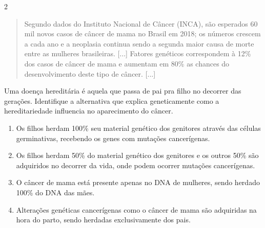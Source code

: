 \num{2}
\begin{quote}
Segundo dados do Instituto Nacional de Câncer (INCA), são esperados
60 mil novos casos de câncer de mama no Brasil em 2018; os números
crescem a cada ano e a neoplasia continua sendo a segunda maior causa
de morte entre as mulheres brasileiras. [...]
Fatores genéticos correspondem
à 12\% dos casos de câncer de mama e aumentam em 80\% as chances do
desenvolvimento deste tipo de câncer. [...]

\end{quote}

Uma doença hereditária é aquela que passa de pai pra filho no decorrer
das gerações. Identifique a alternativa que explica geneticamente como a
hereditariedade influencia no aparecimento do câncer.

\begin{enumerate}
\item
  Os filhos herdam 100\% seu material genético dos genitores através das
  células germinativas, recebendo os genes com mutações cancerígenas.
\item
  Os filhos herdam 50\% do material genético dos genitores e os outros
  50\% são adquiridos no decorrer da vida, onde podem ocorrer mutações
  cancerígenas.
\item
  O câncer de mama está presente apenas no DNA de mulheres, sendo herdado
  100\% do DNA das mães.
\item
  Alterações genéticas cancerígenas como o câncer de mama são adquiridas
  na hora do parto, sendo herdadas exclusivamente dos pais.
\end{enumerate}


